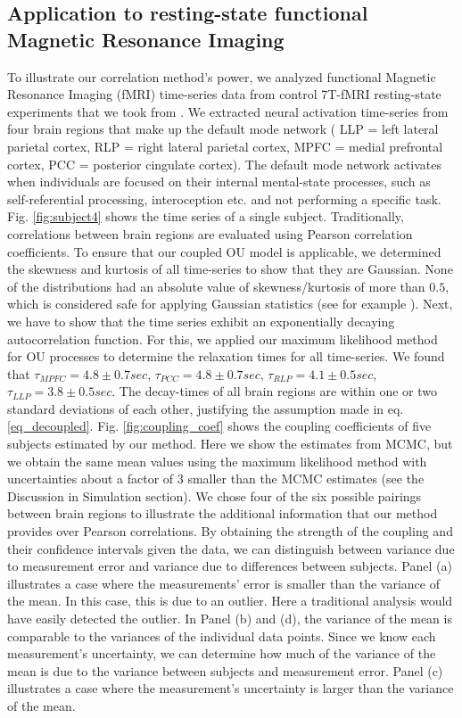 \documentclass[%
 reprint,
 amsmath,amssymb,
 aps,
]{revtex4-1}
\begin{document}
\subsection{Application to resting-state functional Magnetic Resonance Imaging}
To illustrate our correlation method's power, we analyzed functional Magnetic Resonance Imaging (fMRI) time-series data from control 7T-fMRI resting-state experiments that we took from \cite{RN98}.  We extracted neural activation time-series from four brain regions that make up the default mode network \cite{RN99} ( LLP = left lateral parietal cortex, RLP = right lateral parietal cortex, MPFC = medial prefrontal cortex, PCC = posterior cingulate cortex).  The default mode network activates when individuals are focused on their internal mental-state processes, such as self-referential processing, interoception etc. and not performing a specific task.  Fig. \ref{fig:subject4} shows the time series of a single subject.  Traditionally, correlations between brain regions are evaluated using Pearson correlation coefficients.  To ensure that our coupled OU model is applicable, we determined the skewness and kurtosis of all time-series to show that they are Gaussian.  None of the distributions had an absolute value of skewness/kurtosis of more than $0.5$, which is considered safe for applying Gaussian statistics (see for example \cite{RN100}).  Next, we have to show that the time series exhibit an exponentially decaying autocorrelation function.  For this, we applied our maximum likelihood method for OU processes to determine the relaxation times for all time-series.  We found that $\tau_{MPFC}=4.8 \pm 0.7 sec$, $\tau_{PCC}=4.8 \pm 0.7 sec$, $\tau_{RLP}=4.1 \pm 0.5 sec$, $\tau_{LLP}=3.8 \pm 0.5 sec$.  The decay-times of all brain regions are within one or two standard deviations of each other, justifying the assumption made in eq. \ref{eq_decoupled}.
Fig. \ref{fig:coupling_coef} shows the coupling coefficients of five subjects estimated by our method.  Here we show the estimates from MCMC, but we obtain the same mean values using the maximum likelihood method with uncertainties about a factor of 3 smaller than the MCMC estimates (see the Discussion in Simulation section).  We chose four of the six possible pairings between brain regions to illustrate the additional information that our method provides over Pearson correlations.  By obtaining the strength of the coupling and their confidence intervals given the data, we can distinguish between variance due to measurement error and variance due to differences between subjects.  Panel (a) illustrates a case where the measurements' error is smaller than the variance of the mean.  In this case, this is due to an outlier.  Here a traditional analysis would have easily detected the outlier.  In Panel (b) and (d), the variance of the mean is comparable to the variances of the individual data points.  Since we know each measurement's uncertainty, we can determine how much of the variance of the mean is due to the variance between subjects and measurement error.  Panel (c) illustrates a case where the measurement's uncertainty is larger than the variance of the mean.
\end{document}
